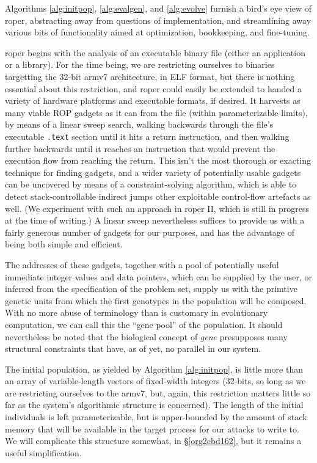 \documentclass[12pt,glossary]{dalthesis}
\begin{document}
Algorithms \ref{alg:initpop}, \ref{alg:evalgen}, and \ref{alg:evolve}
furnish a bird's eye view of \gls{roper}, abstracting away from questions of
implementation, and streamlining away various bits of functionality
aimed at optimization, bookkeeping, and fine-tuning.

\gls{roper} begins with the analysis of an executable binary file (either an
application or a library). For the time being, we are restricting
ourselves to binaries targetting the 32-bit \gls{armv7} architecture, in ELF
format, but there is nothing essential about this restriction, and
\gls{roper} could easily be extended to handed a variety of hardware
platforms and executable formats, if desired. It harvests as many viable
ROP gadgets as it can from the file (within parameterizable limits), by 
means of a linear sweep search, walking backwards through the file's
executable \texttt{.text} section until it hits a return instruction, and then
walking further backwards until it reaches an instruction that would
prevent the execution flow from reaching the return. This isn't the
most thorough or exacting technique for finding gadgets, and a wider
variety of potentially usable gadgets can be uncovered by means of
a constraint-solving algorithm, which is able to detect stack-controllable
indirect jumps other exploitable control-flow artefacts as well. (We experiment
with such an approach in \gls{roper} II, which is still in progress at the time of
writing.) A linear sweep nevertheless suffices to provide us with a fairly
generous number of gadgets for our purposes, and has the advantage of being
both simple and efficient.

The addresses of these gadgets, together with a pool of potentially useful
immediate integer values and data pointers, which can be supplied by the
user, or inferred from the specification of the problem set, supply us with
the primtive genetic units from which the first genotypes in the population will
be composed. With no more abuse of terminology than is customary in evolutionary
computation, we can call this the ``gene pool'' of the population. It should
nevertheless be noted that the biological concept of \emph{gene} presupposes many
structural constraints that have, as of yet, no parallel in our system.

The initial population, as yielded by Algorithm \ref{alg:initpop}, is
little more than an array of variable-length vectors of fixed-width
integers (32-bits, so long as we are restricting ourselves to the
\gls{armv7}, but, again, this restriction matters little so far as the
system's algorithmic structure is concerned). The length of the
initial individuals is left parameterizable, but is upper-bounded by
the amount of stack memory that will be available in the target
process for our attacks to write to. We will complicate this structure
somewhat, in \S \ref{org2cbd162}, but it remains a useful
simplification.
\end{document}
